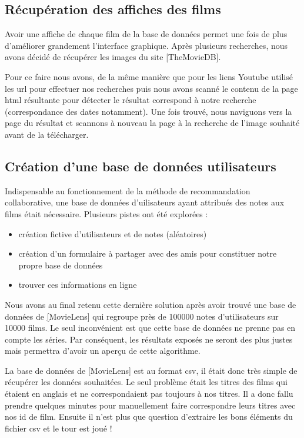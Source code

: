 \documentclass{report}
\begin{document}
\subsection{Récupération des affiches des films}
Avoir une affiche de chaque film de la base de données permet une fois de plus d'améliorer grandement l'interface graphique.
Après plusieurs recherches, nous avons décidé de récupérer les images du site \href{https://www.themoviedb.org}[TheMovieDB].\par
Pour ce faire nous avons, de la même manière que pour les liens Youtube utilisé les url pour effectuer nos recherches puis nous avons scanné le contenu de la page html résultante pour détecter le résultat correspond à notre recherche (correspondance des dates notamment). Une fois trouvé, nous naviguons vers la page du résultat et scannons à nouveau la page à la recherche de l'image souhaité avant de la télécharger.

\subsection{Création d'une base de données utilisateurs}
Indispensable au fonctionnement de la méthode de recommandation collaborative, une base de données d'uilisateurs ayant attribués des notes aux films était nécessaire. Plusieurs pistes ont été explorées :
\begin{itemize}
	\item création fictive d'utilisateurs et de notes (aléatoires)
	\item création d'un formulaire à partager avec des amis pour constituer notre propre base de données
	\item trouver ces informations en ligne
\end{itemize}
Nous avons au final retenu cette dernière solution après avoir trouvé une base de données de \href{https://grouplens.org/datasets/movielens/}[MovieLens] qui regroupe près de 100000 notes d'utilisateurs sur 10000 films. Le seul inconvénient est que cette base de données ne prenne pas en compte les séries. Par conséquent, les résultats exposés ne seront des plus justes mais permettra d'avoir un aperçu de cette algorithme.\par
La base de données de \href{https://grouplens.org/datasets/movielens/}[MovieLens] est au format csv, il était donc très simple de récupérer les données souhaitées. Le seul problème était les titres des films qui étaient en anglais et ne correspondaient pas toujours à nos titres. Il a donc fallu prendre quelques minutes pour manuellement faire correspondre leurs titres avec nos id de film. Ensuite il n'est plus que question d'extraire les bons éléments du fichier csv et le tour est joué !
\end{document}
